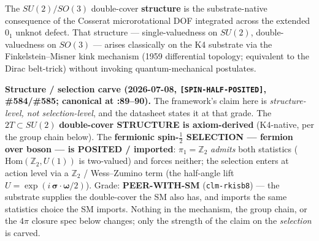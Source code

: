 The $SU(2) / SO(3)$ double-cover \textbf{structure} is the substrate-native consequence of the Cosserat microrotational DOF integrated across the extended $0_1$ unknot defect. That structure --- single-valuedness on $SU(2)$, double-valuedness on $SO(3)$ --- arises classically on the K4 substrate via the Finkelstein--Misner kink mechanism (1959 differential topology; equivalent to the Dirac belt-trick) without invoking quantum-mechanical postulates.

\noindent\textbf{Structure / selection carve (2026-07-08, \texttt{[SPIN-HALF-POSITED]}, \#584/\#585; canonical at :89--90).} The framework's claim here is \emph{structure-level, not selection-level}, and the datasheet states it at that grade. The $2T \subset SU(2)$ \textbf{double-cover STRUCTURE is axiom-derived} (K4-native, per the group chain below). The \textbf{fermionic spin-$\tfrac{1}{2}$ SELECTION --- fermion over boson --- is POSITED / imported}: $\pi_1 = \mathbb{Z}_2$ \emph{admits} both statistics ($\mathrm{Hom}(\mathbb{Z}_2, U(1))$ is two-valued) and forces neither; the selection enters at action level via a $\mathbb{Z}_2$ / Wess--Zumino term (the half-angle lift $U = \exp(i\,\boldsymbol{\sigma}\cdot\boldsymbol{\omega}/2)$). Grade: \textbf{PEER-WITH-SM} (\texttt{clm-rkisb8}) --- the substrate supplies the double-cover the SM also has, and imports the same statistics choice the SM imports. Nothing in the mechanism, the group chain, or the $4\pi$ closure spec below changes; only the strength of the claim on the \emph{selection} is carved.

